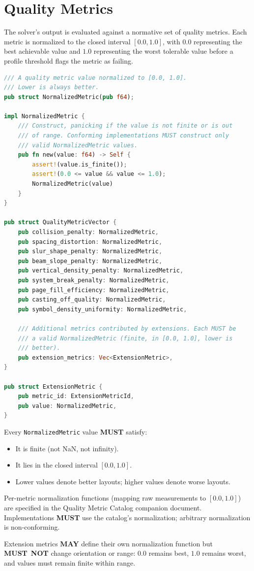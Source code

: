 \documentclass[11pt,letterpaper]{report}
\newcounter{requirement}[chapter]
\newcommand{\MUST}{\textbf{MUST}}
\newcommand{\MUSTNOT}{\textbf{MUST}\nobreak\ \textbf{NOT}}
\newcommand{\MAY}{\textbf{MAY}}
\begin{document}
\section{Quality Metrics}
\label{sec:solver:quality}

The solver's output is evaluated against a normative set of quality
metrics. Each metric is normalized to the closed interval
$[0.0, 1.0]$, with $0.0$ representing the best achievable value and
$1.0$ representing the worst tolerable value before a profile
threshold flags the metric as failing.

\begin{lstlisting}[language=Rust]
/// A quality metric value normalized to [0.0, 1.0].
/// Lower is always better.
pub struct NormalizedMetric(pub f64);

impl NormalizedMetric {
    /// Construct, panicking if the value is not finite or is out
    /// of range. Conforming implementations MUST construct only
    /// valid NormalizedMetric values.
    pub fn new(value: f64) -> Self {
        assert!(value.is_finite());
        assert!(0.0 <= value && value <= 1.0);
        NormalizedMetric(value)
    }
}

pub struct QualityMetricVector {
    pub collision_penalty: NormalizedMetric,
    pub spacing_distortion: NormalizedMetric,
    pub slur_shape_penalty: NormalizedMetric,
    pub beam_slope_penalty: NormalizedMetric,
    pub vertical_density_penalty: NormalizedMetric,
    pub system_break_penalty: NormalizedMetric,
    pub page_fill_efficiency: NormalizedMetric,
    pub casting_off_quality: NormalizedMetric,
    pub symbol_density_uniformity: NormalizedMetric,

    /// Additional metrics contributed by extensions. Each MUST be
    /// a valid NormalizedMetric (finite, in [0.0, 1.0], lower is
    /// better).
    pub extension_metrics: Vec<ExtensionMetric>,
}

pub struct ExtensionMetric {
    pub metric_id: ExtensionMetricId,
    pub value: NormalizedMetric,
}
\end{lstlisting}

\begin{requirement}
  \label{req:solver:normalized-metric-bounds}
  Every \texttt{NormalizedMetric} value \MUST{} satisfy:
  \begin{itemize}
    \item It is finite (not NaN, not infinity).
    \item It lies in the closed interval $[0.0, 1.0]$.
    \item Lower values denote better layouts; higher values denote
      worse layouts.
  \end{itemize}

  Per-metric normalization functions (mapping raw measurements to
  $[0.0, 1.0]$) are specified in the Quality Metric Catalog
  companion document. Implementations \MUST{} use the catalog's
  normalization; arbitrary normalization is non-conforming.

  Extension metrics \MAY{} define their own normalization function
  but \MUSTNOT{} change orientation or range: $0.0$ remains best,
  $1.0$ remains worst, and values must remain finite within range.
\end{requirement}
\end{document}
